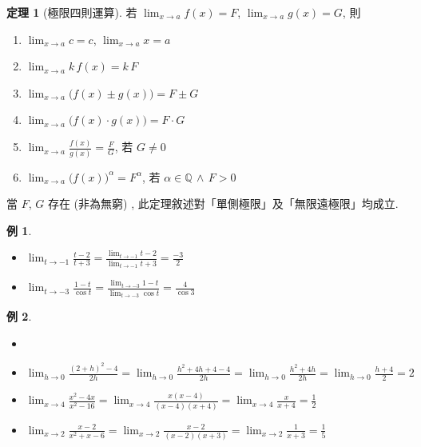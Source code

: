 \documentclass[12pt]{extarticle}
\newcommand{\ds}{\displaystyle}
\theoremstyle{definition}
\newtheorem*{thm}{定理}
\newtheorem*{ex}{例}
\begin{document}
\begin{thm}[極限四則運算]
  若 $\ds\lim_{x\to a}f(x) = F$, $\ds\lim_{x\to a}g(x) = G$, 則
  \begin{multicols}{2}
    \begin{enumerate}\setlength\itemsep{0em}
      \item $\ds\lim_{x\to a} c = c$, $\ds\lim_{x\to a} x = a$
      \item $\ds\lim_{x\to a} k\,f(x) = k\,F$ 
      \item $\ds\lim_{x\to a} \big(f(x)\pm g(x)\big) = F\pm G$ 
      \item $\ds\lim_{x\to a} \big(f(x)\cdot g(x)\big) = F\cdot G$ 
      \item $\ds\lim_{x\to a} \frac{f(x)}{g(x)} = \frac{F}{G}$, 若 $G\ne 0$
      \item $\ds\lim_{x\to a} \big(f(x)\big)^\alpha = F^\alpha$, 若 $\alpha\in\mathbb{Q}\,\wedge\,F > 0$
    \end{enumerate}
  \end{multicols}
  當 $F$, $G$ 存在 (非為無窮) , 此定理敘述對「單側極限」及「無限遠極限」均成立. 
\end{thm}

\begin{ex}
  \begin{multicols}{2}
    \begin{itemize}\setlength\itemsep{0em}
      \item $\ds\lim_{t\to-1}\frac{t - 2}{t + 3} = \frac{\lim_{t\to-1} t - 2}{\lim_{t\to-1}t + 3} = \frac{-3}{2}$
      \item $\ds\lim_{t\to-3}\frac{1 - t}{\cos t} = \frac{\lim_{t\to-3} 1 - t}{\lim_{t\to-3}\cos t} = \frac{4}{\cos{3}}$
    \end{itemize}
  \end{multicols}
\end{ex}

\begin{ex}
  \begin{itemize}\setlength\itemsep{0em}
    \item[]
    \item $\ds\lim_{h\to0}\frac{(2 + h)^2 - 4}{2 h} = \lim_{h\to0}\frac{h^2 + 4h + 4 - 4}{2 h} = \lim_{h\to0}\frac{h^2 + 4h}{2 h} =\lim_{h\to0}\frac{h + 4}{2} = 2$
    \item $\ds\lim_{x\to4}\frac{x^2 - 4x}{x^2 - 16} = \lim_{x\to4}\frac{x(x - 4)}{(x - 4)(x + 4)} = \lim_{x\to4}\frac{x}{x + 4} = \frac{1}{2}$
    \item $\ds\lim_{x\to 2}\frac{x - 2}{x^2 + x - 6} = \lim_{x\to 2}\frac{x - 2}{(x - 2)(x + 3)} = \lim_{x\to2}\frac{1}{x + 3} = \frac{1}{5}$
  \end{itemize}
\end{ex}
\end{document}
